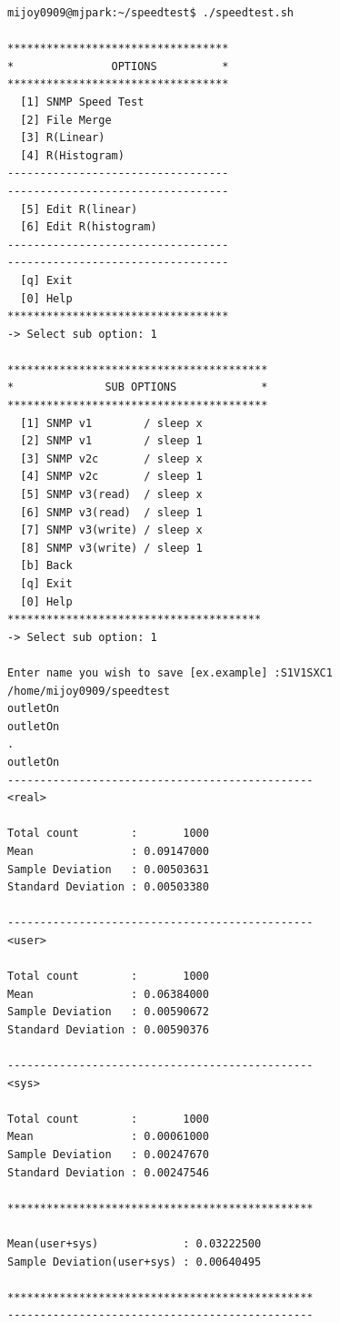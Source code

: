 \documentclass[11pt
  , a4paper
  , article
  , oneside
]{memoir}
\begin{document}
\begin{lstlisting}[style=termstyle, caption=GNU Bash script를 통한 CLI]
mijoy0909@mjpark:~/speedtest$ ./speedtest.sh 

**********************************
*               OPTIONS          *
**********************************
  [1] SNMP Speed Test             
  [2] File Merge                  
  [3] R(Linear)                   
  [4] R(Histogram)                
----------------------------------
----------------------------------
  [5] Edit R(linear)              
  [6] Edit R(histogram)           
----------------------------------
----------------------------------
  [q] Exit                        
  [0] Help                        
**********************************
-> Select sub option: 1

****************************************
*              SUB OPTIONS             *
****************************************
  [1] SNMP v1        / sleep x          
  [2] SNMP v1        / sleep 1          
  [3] SNMP v2c       / sleep x          
  [4] SNMP v2c       / sleep 1          
  [5] SNMP v3(read)  / sleep x          
  [6] SNMP v3(read)  / sleep 1          
  [7] SNMP v3(write) / sleep x          
  [8] SNMP v3(write) / sleep 1          
  [b] Back                              
  [q] Exit                              
  [0] Help                              
***************************************
-> Select sub option: 1

Enter name you wish to save [ex.example] :S1V1SXC1
/home/mijoy0909/speedtest
outletOn
outletOn
.
outletOn
-----------------------------------------------
<real>

Total count        :       1000
Mean               : 0.09147000
Sample Deviation   : 0.00503631
Standard Deviation : 0.00503380

-----------------------------------------------
<user>

Total count        :       1000
Mean               : 0.06384000
Sample Deviation   : 0.00590672
Standard Deviation : 0.00590376

-----------------------------------------------
<sys>

Total count        :       1000
Mean               : 0.00061000
Sample Deviation   : 0.00247670
Standard Deviation : 0.00247546

***********************************************

Mean(user+sys)             : 0.03222500
Sample Deviation(user+sys) : 0.00640495

***********************************************
-----------------------------------------------
\end{lstlisting}
\end{document}
